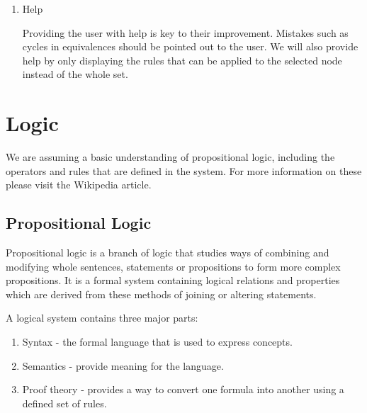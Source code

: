 \documentclass{report}
\begin{document}
\begin{enumerate}
\item Help

Providing the user with help is key to their improvement. Mistakes such as cycles in equivalences should be pointed out to the user. We will also provide help by only displaying the rules that can be applied to the selected node instead of the whole set.


\end{enumerate}

\chapter{Logic}

We are assuming a basic understanding of propositional logic, including the operators and rules that are defined in the system. For more information on these please visit the Wikipedia article\cite{propositionalwiki}.

\section{Propositional Logic}

Propositional logic is a branch of logic that studies ways of combining and modifying whole sentences, statements or propositions to form more complex propositions. It is a formal system containing logical relations and properties which are derived from these methods of joining or altering statements.

A logical system contains three major parts:

\begin{enumerate}
\item Syntax - the formal language that is used to express concepts.
\item Semantics - provide meaning for the language.
\item Proof theory - provides a way to convert one formula into another using a defined set of rules.
\end{enumerate}
\end{document}
